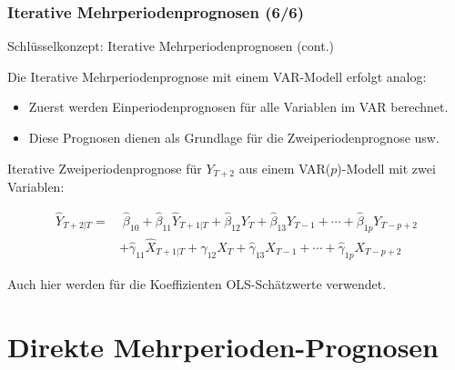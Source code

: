 \documentclass[10pt,aspectratio=169]{beamer}\usepackage[]{graphicx}\usepackage[]{xcolor}
\begin{document}
\begin{frame}
  \frametitle{Iterative Mehrperiodenprognosen \hfill (6/6)}


  \begin{alertblock}{Schlüsselkonzept: Iterative Mehrperiodenprognosen \hfill (cont.)}

  Die Iterative Mehrperiodenprognose mit einem VAR-Modell erfolgt analog: %

\begin{itemize}
  \item Zuerst werden Einperiodenprognosen für alle Variablen im VAR berechnet.
  \item Diese Prognosen dienen als Grundlage für die Zweiperiodenprognose usw.
\end{itemize}

  Iterative Zweiperiodenprognose für $Y_{T+2}$ aus einem VAR($p$)-Modell mit zwei Variablen:

  \begin{align*}
  \widehat{Y}_{T+2|T} = & \; \widehat{\beta}_{10} + \widehat{\beta}_{11} \widehat{Y}_{T+1|T} + \widehat{\beta}_{12} Y_T + \widehat{\beta}_{13} Y_{T-1} + \cdots + \widehat{\beta}_{1p} Y_{T-p+2} \\
  & + \widehat{\gamma}_{11} \widehat{X}_{T+1|T} + \widehat{\gamma}_{12} X_T + \widehat{\gamma}_{13} X_{T-1} + \cdots + \widehat{\gamma}_{1p} X_{T-p+2}
  \end{align*}

  Auch hier werden für die Koeffizienten OLS-Schätzwerte verwendet.

	\end{alertblock}
  
\end{frame}



\section*{Direkte Mehrperioden-Prognosen}
\end{document}
